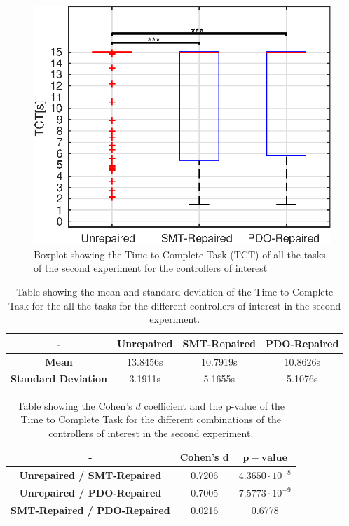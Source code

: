 \begin{figure}[H]
    \centering
    \includegraphics[width=\textwidth]{Images/second-experiment/exp1_TCT.eps}
    \caption{Boxplot showing the Time to Complete Task (TCT) of all the tasks of the second experiment for the controllers of interest}
    \label{fig:box-TCT-all-second}
\end{figure}
\begin{table}[H]
    \centering
    \begin{tabular}{|c|c|c|c|}
        \hline
        - & \textbf{Unrepaired} & \textbf{SMT-Repaired} & \textbf{PDO-Repaired} \\
        \hline
        \textbf{Mean} & 13.8456s & 10.7919s & 10.8626s \\
        \textbf{Standard Deviation} & 3.1911s & 5.1655s & 5.1076s \\
        \hline
    \end{tabular}
    \caption{Table showing the mean and standard deviation of the Time to Complete Task for the all the tasks for the different controllers of interest in the second experiment.}
    \label{tab:TCT-all-second-mean-std}
\end{table}
\begin{table}[H]
    \centering
    \begin{tabular}{|c|c|c|}
        \hline
        - & \textbf{Cohen's} $\mathbf{d}$ & $\mathbf{p-value}$ \\
        \hline
        \textbf{Unrepaired / SMT-Repaired} & 0.7206 & $4.3650 \cdot 10^{-8}$ \\
        \textbf{Unrepaired / PDO-Repaired} & 0.7005 & $7.5773 \cdot 10^{-9}$ \\
        \textbf{SMT-Repaired / PDO-Repaired} & 0.0216 & 0.6778 \\
        \hline
    \end{tabular}
    \caption{Table showing the Cohen's $d$ coefficient and the p-value of the Time to Complete Task for the different combinations of the controllers of interest in the second experiment.}
    \label{tab:TCT-all-second-cohen-p}
\end{table}
